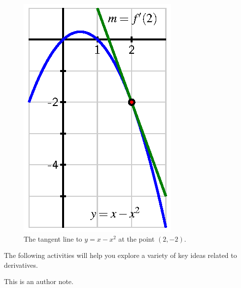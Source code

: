 \begin{figure} \label{F:1.3.Ex1}
\begin{center}
\includegraphics{figures/1_3_Ex1.eps}
\end{center}
\caption{The tangent line to $y = x - x^2$ at the point $(2,-2)$.}
\end{figure}

\afterex

The following activities will help you explore a variety of key ideas related to derivatives.

\newpage








\begin{authornote}
This is an author note.
\end{authornote}


